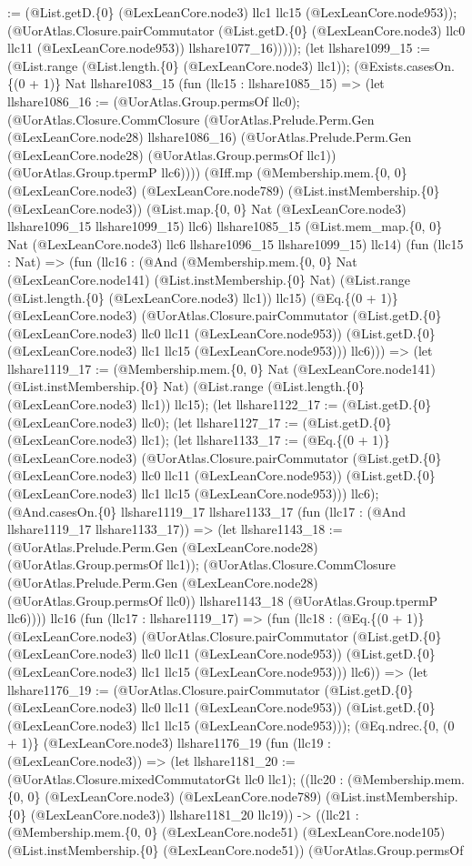 \documentclass[11pt]{article}
\begin{document}
:= (@List.getD.\{0\} (@LexLeanCore.node3) llc1 llc15 (@LexLeanCore.node953)); (@UorAtlas.Closure.pairCommutator (@List.getD.\{0\} (@LexLeanCore.node3) llc0 llc11 (@LexLeanCore.node953)) llshare1077\_16))))); (let llshare1099\_15 := (@List.range (@List.length.\{0\} (@LexLeanCore.node3) llc1)); (@Exists.casesOn.\{(0 + 1)\} Nat llshare1083\_15 (fun (llc15 : llshare1085\_15) => (let llshare1086\_16 := (@UorAtlas.Group.permsOf llc0); (@UorAtlas.Closure.CommClosure (@UorAtlas.Prelude.Perm.Gen (@LexLeanCore.node28) llshare1086\_16) (@UorAtlas.Prelude.Perm.Gen (@LexLeanCore.node28) (@UorAtlas.Group.permsOf llc1)) (@UorAtlas.Group.tpermP llc6)))) (@Iff.mp (@Membership.mem.\{0, 0\} (@LexLeanCore.node3) (@LexLeanCore.node789) (@List.instMembership.\{0\} (@LexLeanCore.node3)) (@List.map.\{0, 0\} Nat (@LexLeanCore.node3) llshare1096\_15 llshare1099\_15) llc6) llshare1085\_15 (@List.mem\_map.\{0, 0\} Nat (@LexLeanCore.node3) llc6 llshare1096\_15 llshare1099\_15) llc14) (fun (llc15 : Nat) => (fun (llc16 : (@And (@Membership.mem.\{0, 0\} Nat (@LexLeanCore.node141) (@List.instMembership.\{0\} Nat) (@List.range (@List.length.\{0\} (@LexLeanCore.node3) llc1)) llc15) (@Eq.\{(0 + 1)\} (@LexLeanCore.node3) (@UorAtlas.Closure.pairCommutator (@List.getD.\{0\} (@LexLeanCore.node3) llc0 llc11 (@LexLeanCore.node953)) (@List.getD.\{0\} (@LexLeanCore.node3) llc1 llc15 (@LexLeanCore.node953))) llc6))) => (let llshare1119\_17 := (@Membership.mem.\{0, 0\} Nat (@LexLeanCore.node141) (@List.instMembership.\{0\} Nat) (@List.range (@List.length.\{0\} (@LexLeanCore.node3) llc1)) llc15); (let llshare1122\_17 := (@List.getD.\{0\} (@LexLeanCore.node3) llc0); (let llshare1127\_17 := (@List.getD.\{0\} (@LexLeanCore.node3) llc1); (let llshare1133\_17 := (@Eq.\{(0 + 1)\} (@LexLeanCore.node3) (@UorAtlas.Closure.pairCommutator (@List.getD.\{0\} (@LexLeanCore.node3) llc0 llc11 (@LexLeanCore.node953)) (@List.getD.\{0\} (@LexLeanCore.node3) llc1 llc15 (@LexLeanCore.node953))) llc6); (@And.casesOn.\{0\} llshare1119\_17 llshare1133\_17 (fun (llc17 : (@And llshare1119\_17 llshare1133\_17)) => (let llshare1143\_18 := (@UorAtlas.Prelude.Perm.Gen (@LexLeanCore.node28) (@UorAtlas.Group.permsOf llc1)); (@UorAtlas.Closure.CommClosure (@UorAtlas.Prelude.Perm.Gen (@LexLeanCore.node28) (@UorAtlas.Group.permsOf llc0)) llshare1143\_18 (@UorAtlas.Group.tpermP llc6)))) llc16 (fun (llc17 : llshare1119\_17) => (fun (llc18 : (@Eq.\{(0 + 1)\} (@LexLeanCore.node3) (@UorAtlas.Closure.pairCommutator (@List.getD.\{0\} (@LexLeanCore.node3) llc0 llc11 (@LexLeanCore.node953)) (@List.getD.\{0\} (@LexLeanCore.node3) llc1 llc15 (@LexLeanCore.node953))) llc6)) => (let llshare1176\_19 := (@UorAtlas.Closure.pairCommutator (@List.getD.\{0\} (@LexLeanCore.node3) llc0 llc11 (@LexLeanCore.node953)) (@List.getD.\{0\} (@LexLeanCore.node3) llc1 llc15 (@LexLeanCore.node953))); (@Eq.ndrec.\{0, (0 + 1)\} (@LexLeanCore.node3) llshare1176\_19 (fun (llc19 : (@LexLeanCore.node3)) => (let llshare1181\_20 := (@UorAtlas.Closure.mixedCommutatorGt llc0 llc1); ((llc20 : (@Membership.mem.\{0, 0\} (@LexLeanCore.node3) (@LexLeanCore.node789) (@List.instMembership.\{0\} (@LexLeanCore.node3)) llshare1181\_20 llc19)) -> ((llc21 : (@Membership.mem.\{0, 0\} (@LexLeanCore.node51) (@LexLeanCore.node105) (@List.instMembership.\{0\} (@LexLeanCore.node51)) (@UorAtlas.Group.permsOf 
\end{document}
